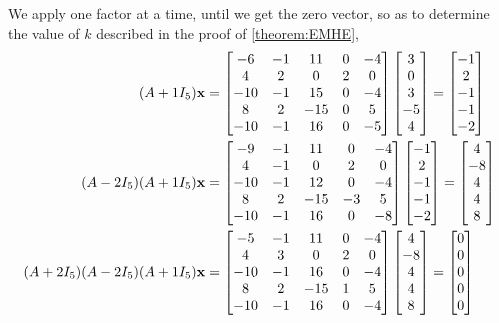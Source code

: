 \documentclass{ximera}
\begin{document}
\begin{example}
We apply one factor at a time, until we get the zero vector, so as to determine the value of $k$ described in the proof of \ref{theorem:EMHE},
\begin{align*}
(A+1I_5)\mathbf{x}&=
\begin{bmatrix}
-6 & -1 & 11 & 0 & -4\\
4 & 2 & 0 & 2 & 0\\
-10 & -1 & 15 & 0 & -4\\
8 & 2 & -15 & 0 & 5\\
-10 & -1 & 16 & 0 & -5
\end{bmatrix}
\begin{bmatrix}3\\0\\3\\-5\\4\end{bmatrix}
=
\begin{bmatrix}-1\\2\\-1\\-1\\-2\end{bmatrix}\\
(A-2I_5)(A+1I_5)\mathbf{x}&=
\begin{bmatrix}
-9 & -1 & 11 & 0 & -4\\
4 & -1 & 0 & 2 & 0\\
-10 & -1 & 12 & 0 & -4\\
8 & 2 & -15 & -3 & 5\\
-10 & -1 & 16 & 0 & -8
\end{bmatrix}
\begin{bmatrix}-1\\2\\-1\\-1\\-2\end{bmatrix}
=
\begin{bmatrix}4\\-8\\4\\4\\8\end{bmatrix}\\
(A+2I_5)(A-2I_5)(A+1I_5)\mathbf{x}&=
\begin{bmatrix}
-5 & -1 & 11 & 0 & -4\\
4 & 3 & 0 & 2 & 0\\
-10 & -1 & 16 & 0 & -4\\
8 & 2 & -15 & 1 & 5\\
-10 & -1 & 16 & 0 & -4
\end{bmatrix}
\begin{bmatrix}4\\-8\\4\\4\\8\end{bmatrix}
=
\begin{bmatrix}0\\0\\0\\0\\0\end{bmatrix}\\
\end{align*}


\end{example}
\end{document}
